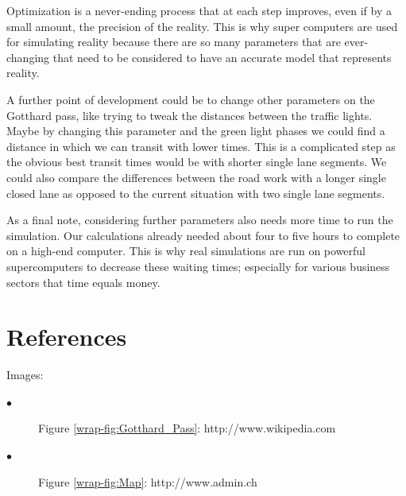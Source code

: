 \documentclass[11pt,a4paper,parskip=half-]{article}
\begin{document}
Optimization is a never-ending process that at each step improves, even if by a small amount, the precision of the reality. This is why super computers are used for simulating reality because there are so many parameters that are ever-changing that need to be considered to have an accurate model that represents reality.



\vspace{5mm}

A further point of development could be to change other parameters on the Gotthard pass, like trying to tweak the distances between the traffic lights. Maybe by changing this parameter and the green light phases we could find a distance in which we can transit with lower times. This is a complicated step as the obvious best transit times would be with shorter single lane segments. We could also compare the differences between the road work with a longer single closed lane as opposed to the current situation with two single lane segments. 


As a final note, considering further parameters also needs more time to run the simulation. Our calculations already needed about four to five hours to complete on a high-end computer. This is why real simulations are run on powerful supercomputers to decrease these waiting times; especially for various business sectors that time equals money. 



\clearpage

\section{References}
 \setlength{\parindent}{0em}
 
Images:

\begin{description}

\item[$\bullet$ ] Figure \ref{wrap-fig:Gotthard_Pass}: http://www.wikipedia.com

\item[$\bullet$ ] Figure \ref{wrap-fig:Map}: http://www.admin.ch

\end{description}

\vspace{5mm}
\end{document}
